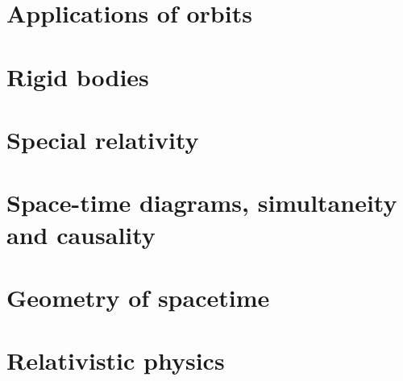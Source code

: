 \documentclass{article}
\begin{document}
\section{Applications of orbits}

\section{Rigid bodies}

\section{Special relativity}

\section{Space-time diagrams, simultaneity and causality}

\section{Geometry of spacetime}

\section{Relativistic physics}

\end{document}
